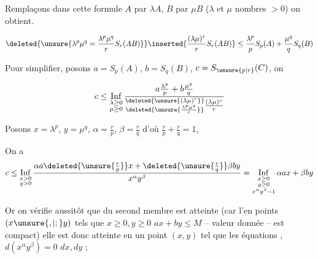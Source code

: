 
Remplaçons dans cette formule $A$ par $\lambda A$, $B$ par $\mu B$ ($\lambda$ et $\mu$ nombres $>0$) on obtient.

\[
\deleted{\unsure{\lambda^p\mu^q=\frac{\lambda^p\mu^q}{r}S_r(AB)}}
\inserted{\frac{(\lambda\mu)^r}{r}S_r(AB)}
\leq\frac{\lambda^p}{p}S_p(A)+\frac{\mu^q}{q}S_q(B)
\]



Pour simplifier, posons $a=S_p(A)$, $b=S_q(B)$, $c=S_{\unsure{p|r}}(C)$, on 

\[
c\leq\mathop{\mathrm{Inf}}\limits_{\substack{\lambda\geq0\\\mu\geq0}}
\frac{a\frac{\lambda^p}{p}+b\frac{\mu^q}{q}}
{\substack{\deleted{\unsure{(\lambda\mu)^r}}\\\deleted{\unsure{\frac{\lambda^p\mu^q}{r}}}}\frac{(\lambda\mu)^r}{r}}
\]


Posons $x=\lambda^p$, $y=\mu^q$, $\alpha=\frac rp$, $\beta=\frac rq$  d'où \unsure{,} \uline{$\frac rp+\frac rq=1$},

On a
\[
c\leq\mathop{\mathrm{Inf}}\limits_{\substack{x>0\\y>0}}
\frac{\alpha a\deleted{\unsure{\frac rp}}x+\deleted{\unsure{\frac rq}}\beta by}{x^\alpha y^\beta}
=\mathop{\mathrm{Inf}}\limits_{\substack{x\geq0\\y\geq0\\x^\alpha y^\beta=1}}\alpha a x+\beta by
\]

Or on vérifie aussitôt que   du second membre est atteinte (car l'en  points $(x\unsure{,|;}y)$ tels que $x\geq0,y\geq0$ $ax+by\leq M$ -- valeur donnée -- est compact) elle est donc atteinte en un point $(x,y)$ tel que les équations , $d(x^\alpha y^\beta)=0$   $dx,dy$ ;

